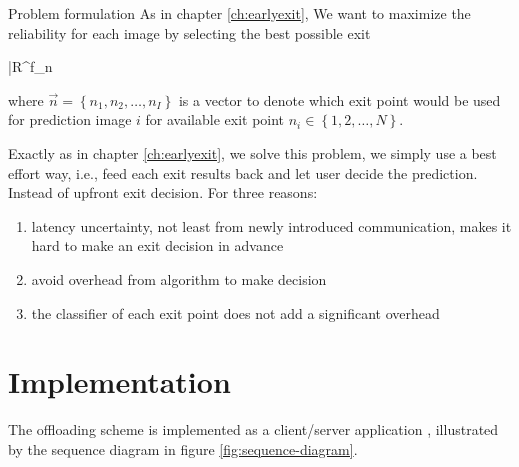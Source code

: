 \begin{enumdescript}
		\item[Problem formulation]   As in chapter \ref{ch:earlyexit},  We want to maximize the reliability for each image by selecting the best possible exit
		
		
		\begin{maxi}
			{}{\bar{R}^f_n}
			{}{}
		\end{maxi}
	
		where $ \vec{n} = \left\{ n_1, n_2, \dots, n_I \right\}$ is a vector to denote which exit point would be used for prediction image $ i $ for available exit point $ n_i \in \left\{1,2, \dots, N\right\} $.
		
		Exactly as in chapter \ref{ch:earlyexit}, we solve this problem, we simply use a best effort way, i.e., feed each exit results back and let user decide the prediction. Instead of upfront exit decision. For three reasons:
		\begin{enumerate}
			\item latency uncertainty, not least from newly introduced communication, makes it hard to make an exit decision in advance
			\item avoid overhead from algorithm to make decision
			\item the classifier of each exit point does not add a significant overhead
		\end{enumerate}
		
			
	\end{enumdescript}  

\section{Implementation} \label{sec:edge-implementation}

The offloading scheme is implemented as a client/server application \cite{sommerville_software_2015}, illustrated by the sequence diagram in figure \ref{fig:sequence-diagram}. 

